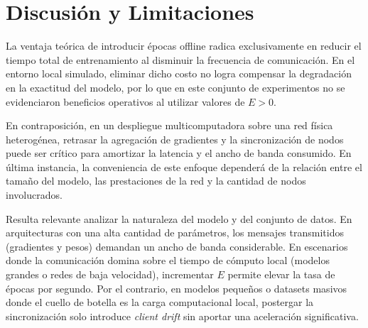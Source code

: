 
\section{Discusión y Limitaciones}

La ventaja teórica de introducir épocas offline radica exclusivamente en reducir el tiempo total de entrenamiento al disminuir la frecuencia de comunicación. En el entorno local simulado, eliminar dicho costo no logra compensar la degradación en la exactitud del modelo, por lo que en este conjunto de experimentos no se evidenciaron beneficios operativos al utilizar valores de $E > 0$.

En contraposición, en un despliegue multicomputadora sobre una red física heterogénea, retrasar la agregación de gradientes y la sincronización de nodos puede ser crítico para amortizar la latencia y el ancho de banda consumido. En última instancia, la conveniencia de este enfoque dependerá de la relación entre el tamaño del modelo, las prestaciones de la red y la cantidad de nodos involucrados.

Resulta relevante analizar la naturaleza del modelo y del conjunto de datos. En arquitecturas con una alta cantidad de parámetros, los mensajes transmitidos (gradientes y pesos) demandan un ancho de banda considerable. En escenarios donde la comunicación domina sobre el tiempo de cómputo local (modelos grandes o redes de baja velocidad), incrementar $E$ permite elevar la tasa de épocas por segundo. Por el contrario, en modelos pequeños o datasets masivos donde el cuello de botella es la carga computacional local, postergar la sincronización solo introduce \emph{client drift} sin aportar una aceleración significativa.
